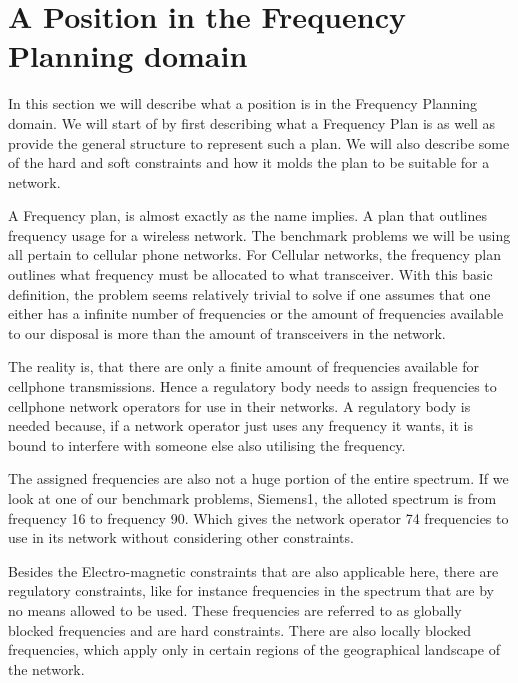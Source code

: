 \section{A Position in the Frequency Planning domain}
In this section we will describe what a position is in the Frequency Planning domain. We will start of by first describing what a Frequency Plan is as well as provide the general structure to represent such a plan.
We will also describe some of the hard and soft constraints and how it molds the plan to be suitable for a network.

A Frequency plan, is almost exactly as the name implies. A plan that outlines frequency usage for a wireless network. The benchmark problems we will be using all pertain to cellular phone networks. For Cellular networks,
the frequency plan outlines what frequency must be allocated to what transceiver. With this basic definition, the problem seems relatively trivial to solve if one assumes that one either has a infinite number of frequencies
or the amount of frequencies available to our disposal is more than the amount of transceivers in the network. 

The reality is, that there are only a finite amount of frequencies available for cellphone transmissions. Hence a regulatory body needs to assign frequencies to cellphone network operators for use in their networks. A regulatory
body is needed because, if a network operator just uses any frequency it wants, it is bound to interfere with someone else also utilising the frequency.

The assigned frequencies are also not a huge portion of the entire spectrum. If we look at one of our benchmark problems, Siemens1, the alloted spectrum is from frequency 16 to frequency 90. Which gives the network operator 74
frequencies to use in its network without considering other constraints. 

Besides the Electro-magnetic constraints that are also applicable here, there are regulatory constraints, like for instance frequencies in the spectrum that are by no means allowed to be used. These frequencies are referred to as
globally blocked frequencies and are hard constraints. There are also locally blocked frequencies, which apply only in certain regions of the geographical landscape of the network.

